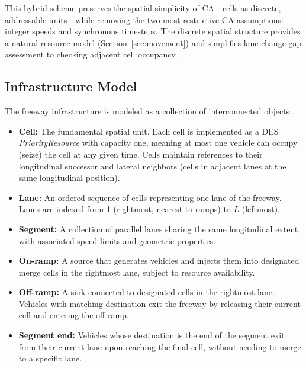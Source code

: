 \documentclass[review,authoryear]{elsarticle}
\begin{document}
This hybrid scheme preserves the spatial simplicity of CA---cells as discrete, addressable units---while removing the two most restrictive CA assumptions: integer speeds and synchronous timesteps. The discrete spatial structure provides a natural resource model (Section~\ref{sec:movement}) and simplifies lane-change gap assessment to checking adjacent cell occupancy.

\subsection{Infrastructure Model}
\label{sec:infrastructure}

The freeway infrastructure is modeled as a collection of interconnected objects:

\begin{itemize}
    \item \textbf{Cell:} The fundamental spatial unit. Each cell is implemented as a DES \emph{PriorityResource} with capacity one, meaning at most one vehicle can occupy (seize) the cell at any given time. Cells maintain references to their longitudinal successor and lateral neighbors (cells in adjacent lanes at the same longitudinal position).

    \item \textbf{Lane:} An ordered sequence of cells representing one lane of the freeway. Lanes are indexed from 1 (rightmost, nearest to ramps) to $L$ (leftmost).

    \item \textbf{Segment:} A collection of parallel lanes sharing the same longitudinal extent, with associated speed limits and geometric properties.

    \item \textbf{On-ramp:} A source that generates vehicles and injects them into designated merge cells in the rightmost lane, subject to resource availability.

    \item \textbf{Off-ramp:} A sink connected to designated cells in the rightmost lane. Vehicles with matching destination exit the freeway by releasing their current cell and entering the off-ramp.

    \item \textbf{Segment end:} Vehicles whose destination is the end of the segment exit from their current lane upon reaching the final cell, without needing to merge to a specific lane.
\end{itemize}
\end{document}
